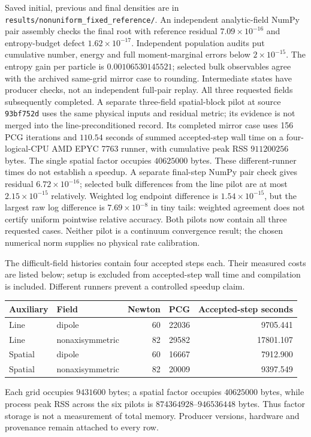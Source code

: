 \documentclass[11pt,letterpaper]{article}
\begin{document}
Saved initial, previous and final densities are in
\texttt{results/}\allowbreak\texttt{nonuniform\_fixed\_reference/}. An independent
analytic-field NumPy pair assembly checks the final root with reference residual
$7.09\times10^{-16}$ and entropy-budget defect $1.62\times10^{-17}$.
Independent population audits put cumulative number, energy and full
moment-marginal errors below $2\times10^{-15}$. The entropy gain per particle
is $0.00106530145521$; selected bulk observables agree with the archived
same-grid mirror case to rounding. Intermediate states have producer checks,
not an independent full-pair replay. All three requested fields subsequently
completed. A separate three-field spatial-block pilot
at source \texttt{93bf752d} uses the same physical inputs and residual metric;
its evidence is not merged into the line-preconditioned record. Its completed
mirror case uses 156 PCG iterations and $110.54$ seconds of summed accepted-step
wall time on a four-logical-CPU AMD EPYC 7763 runner, with cumulative peak RSS
$911200256$ bytes. The single spatial factor occupies $40625000$ bytes.
These different-runner times do not establish a speedup. A separate final-step
NumPy pair check gives residual $6.72\times10^{-16}$; selected bulk differences
from the line pilot are at most $2.15\times10^{-15}$ relatively. Weighted log
endpoint difference is $1.54\times10^{-15}$, but the largest raw log difference
is $7.69\times10^{-8}$ in tiny tails: weighted agreement does not certify
uniform pointwise relative accuracy. Both pilots now contain all three requested cases. Neither pilot is a
continuum convergence result; the chosen numerical norm supplies no physical
rate calibration.

The difficult-field histories contain four accepted steps each. Their measured
costs are listed below; setup is excluded from accepted-step wall time and
compilation is included. Different runners prevent a controlled speedup claim.
\begin{center}
\begin{tabular}{llrrr}
\toprule
Auxiliary & Field & Newton & PCG & Accepted-step seconds\\
\midrule
Line & dipole &60&22036&9705.441\\
Line & nonaxisymmetric &82&29582&17801.107\\
Spatial & dipole &60&16667&7912.900\\
Spatial & nonaxisymmetric &82&20009&9397.549\\
\bottomrule
\end{tabular}
\end{center}
Each grid occupies $9431600$ bytes; a spatial factor occupies $40625000$
bytes, while process peak RSS across the six pilots is $874364928$--$946536448$
bytes. Thus factor storage is not a measurement of total memory. Producer
versions, hardware and provenance remain attached to every row.
\end{document}
